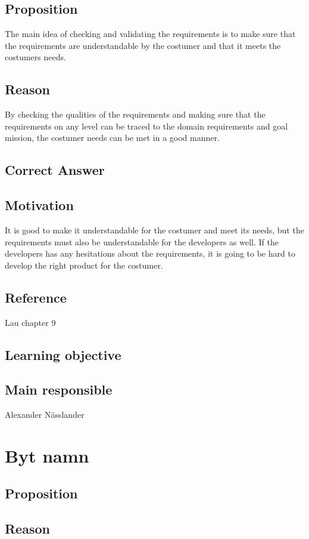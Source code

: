 \documentclass[a4paper]{article}
\begin{document}
\subsection*{Proposition}
The main idea of checking and validating the requirements is to make sure that the requirements are understandable by the costumer and that it meets the costumers needs.
\subsection*{Reason}
By checking the qualities of the requirements and making sure that the requirements on any level can be traced to the domain requirements and goal mission, the costumer needs can be met in a good manner.
\subsection*{Correct Answer}

\subsection*{Motivation}
 It is good to make it understandable for the costumer and meet its needs, but the requirements must also be understandable for the developers as well. If the developers has any hesitations about the requirements, it is going to be hard to develop the right product for the costumer.
\subsection*{Reference}
Lau chapter 9
\subsection*{Learning objective}

\subsection*{Main responsible}
Alexander Nässlander




\section{Byt namn}
\subsection*{Proposition}

\subsection*{Reason}
\end{document}
